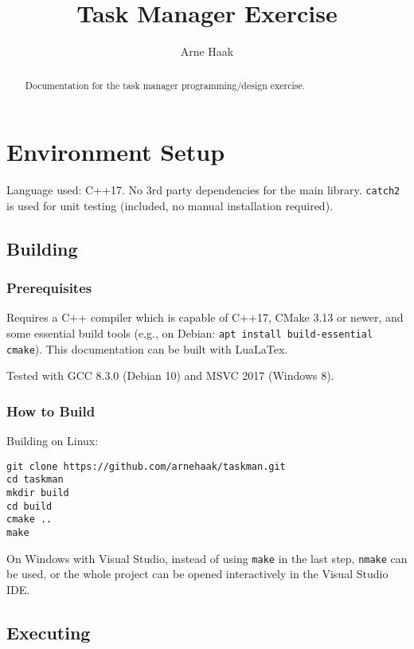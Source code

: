 \documentclass[a4paper]{scrartcl}
\title{Task Manager Exercise}
\author{Arne Haak}
\begin{document}
\maketitle

\begin{abstract}
Documentation for the task manager programming/design exercise.
\end{abstract}

\tableofcontents
\newpage

\section{Environment Setup}

Language used: C++17. No 3rd party dependencies for the main library. \texttt{catch2} is used for unit testing (included, no manual installation required).

\subsection{Building}

\subsubsection{Prerequisites}
Requires a C++ compiler which is capable of C++17, CMake 3.13 or newer, and some essential build tools (e.g., on Debian: \texttt{apt install build-essential cmake}).
This documentation can be built with LuaLaTex.

Tested with GCC 8.3.0 (Debian 10) and MSVC 2017 (Windows 8).

\subsubsection{How to Build}
Building on Linux:
\begin{verbatim}
git clone https://github.com/arnehaak/taskman.git
cd taskman
mkdir build
cd build
cmake ..
make
\end{verbatim}

On Windows with Visual Studio, instead of using \texttt{make} in the last step, \texttt{nmake} can be used, or the whole project can be opened interactively in the Visual Studio IDE.

\subsection{Executing}
\end{document}
